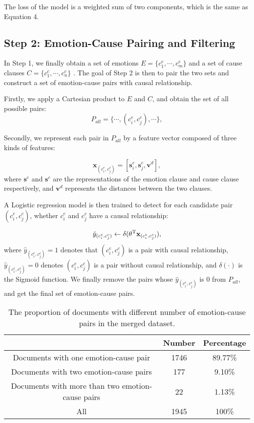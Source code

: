 \documentclass[11pt,a4paper]{article}
\begin{document}
The loss of the model is a weighted sum of two components, which is the same as Equation 4.



\subsection{Step 2: Emotion-Cause Pairing and Filtering}
In Step 1, we finally obtain a set of emotions $ E=\{c_1^e,\cdots,c_m^e \} $ and a set of cause clauses $ C=\{c_1^c,\cdots,c_n^c \} $ . The goal of Step 2 is then to pair the two sets and construct a set of emotion-cause pairs with causal relationship.

Firstly, we apply a Cartesian product to $ E $ and $ C $, and obtain the set of all possible pairs:
\begin{equation}\label{key}
P_{all}= \{ \cdots,(c^e_i,c^c_j ),\cdots \},
\end{equation}

Secondly, we represent each pair in $ P_{all} $ by a feature vector composed of three kinds of features:


\begin{equation}\label{key}
\mathbf{x}_{(c^e_i,c^c_j )} = [\mathbf{s}^e_i, \mathbf{s}^c_j, \mathbf{v}^d],
\end{equation}
where  $ \mathbf{s}^e $ and $ \mathbf{s}^c $ are the representations of the emotion clause and cause clause respectively, and $ \mathbf{v}^d $ represents the distances between the two clauses.

A Logistic regression model is then trained to detect for each candidate pair $ (c_i^e,c_j^c ) $, whether $ c_i^e $ and $ c_j^c $ have a causal relationship:

\begin{equation}\label{key}
\hat{y}_{(c^e_i,c^c_j )} \leftarrow \delta (\mathbf{\theta}^{\rm T} \mathbf{x}_{(c^e_i,c^c_j )}),
\end{equation}
where $ \hat{y}_{(c^e_i,c^c_j )}=1 $ denotes that $ (c^e_i,c^c_j ) $ is a pair with causal relationship,  $ \hat{y}_{(c^e_i,c^c_j )}=0 $ denotes $ (c^e_i,c^c_j ) $ is a pair without causal relationship, and $ \delta(\cdot) $ is the Sigmoid function.
We finally remove the pairs whose $ \hat{y}_{(c^e_i,c^c_j )} $ is 0 from $ P_{all} $, and get the final set of emotion-cause pairs.




\begin{table*}
	\small
	\centering
	\begin{tabular} {c|c|c}
		\hline   & Number & Percentage\\
		\hline
		Documents with one emotion-cause pair & 1746 & 89.77\% \\
		Documents with two emotion-cause pairs &	177 &	9.10\% \\
		Documents with more than two emotion-cause pairs &	22 &	1.13\% \\
		All &	1945 &	100\% \\
		\hline
	\end{tabular}
	\caption{The proportion of documents with different number of emotion-cause pairs in the merged dataset. }
	\label{TableTwo}
\end{table*}
\end{document}
